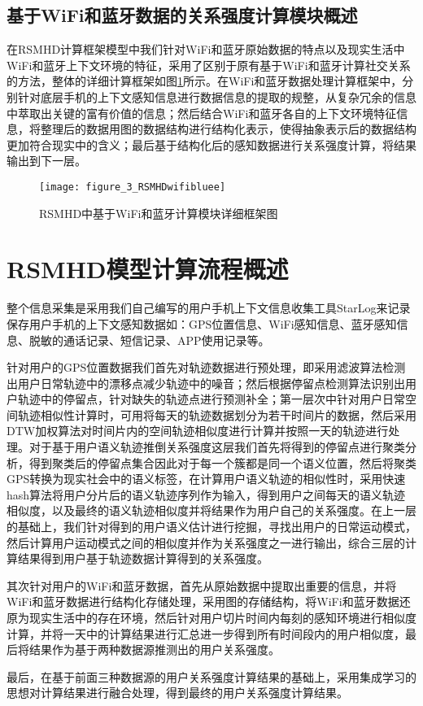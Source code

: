 \subsection{基于WiFi和蓝牙数据的关系强度计算模块概述}
在RSMHD计算框架模型中我们针对WiFi和蓝牙原始数据的特点以及现实生活中WiFi和蓝牙上下文环境的特征，采用了区别于原有基于WiFi和蓝牙计算社交关系的方法，整体的详细计算框架如图\ref{fig:7_1_wifi}所示。在WiFi和蓝牙数据处理计算框架中，分别针对底层手机的上下文感知信息进行数据信息的提取的规整，从复杂冗余的信息中萃取出关键的富有价值的信息；然后结合WiFi和蓝牙各自的上下文环境特征信息，将整理后的数据用图的数据结构进行结构化表示，使得抽象表示后的数据结构更加符合现实中的含义；最后基于结构化后的感知数据进行关系强度计算，将结果输出到下一层。
\begin{figure}[htp]
\centering
\texttt{[image: figure\_3\_RSMHDwifibluee]}
\caption{RSMHD中基于WiFi和蓝牙计算模块详细框架图}
\label{fig:7_1_wifi}
\end{figure}
\section{RSMHD模型计算流程概述}
\label{sec:section7-2}
整个信息采集是采用我们自己编写的用户手机上下文信息收集工具StarLog来记录保存用户手机的上下文感知数据如：GPS位置信息、WiFi感知信息、蓝牙感知信息、脱敏的通话记录、短信记录、APP使用记录等。
\par 针对用户的GPS位置数据我们首先对轨迹数据进行预处理，即采用滤波算法检测出用户日常轨迹中的漂移点减少轨迹中的噪音；然后根据停留点检测算法识别出用户轨迹中的停留点，针对缺失的轨迹点进行预测补全；第一层次中针对用户日常空间轨迹相似性计算时，可用将每天的轨迹数据划分为若干时间片的数据，然后采用DTW加权算法对时间片内的空间轨迹相似度进行计算并按照一天的轨迹进行处理。对于基于用户语义轨迹推倒关系强度这层我们首先将得到的停留点进行聚类分析，得到聚类后的停留点集合因此对于每一个簇都是同一个语义位置，然后将聚类GPS转换为现实社会中的语义标签，在计算用户语义轨迹的相似性时，采用快速hash算法将用户分片后的语义轨迹序列作为输入，得到用户之间每天的语义轨迹相似度，以及最终的语义轨迹相似度并将结果作为用户自己的关系强度。在上一层的基础上，我们针对得到的用户语义估计进行挖掘，寻找出用户的日常运动模式，然后计算用户运动模式之间的相似度并作为关系强度之一进行输出，综合三层的计算结果得到用户基于轨迹数据计算得到的关系强度。
\par 其次针对用户的WiFi和蓝牙数据，首先从原始数据中提取出重要的信息，并将WiFi和蓝牙数据进行结构化存储处理，采用图的存储结构，将WiFi和蓝牙数据还原为现实生活中的存在环境，然后针对用户切片时间内每刻的感知环境进行相似度计算，并将一天中的计算结果进行汇总进一步得到所有时间段内的用户相似度，最后将结果作为基于两种数据源推测出的用户关系强度。
\par 最后，在基于前面三种数据源的用户关系强度计算结果的基础上，采用集成学习的思想对计算结果进行融合处理，得到最终的用户关系强度计算结果。

